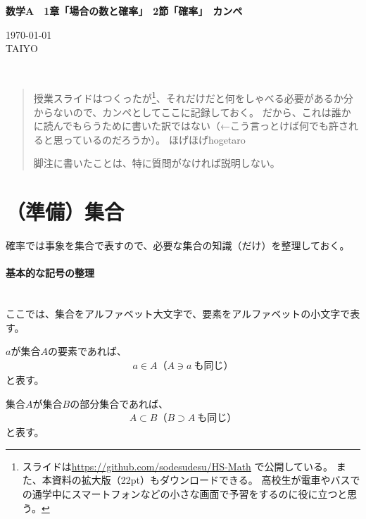 \documentclass[luatexja,fontsize=12pt]{jlreq}\usepackage{ifthen}\newcounter{enlarge}\setcounter{enlarge}{1}
\newcommand{\LS}[2]{\ifthenelse{\value{enlarge}=2 \OR \value{enlarge}=3}{#1}{#2}}
\newcommand{\LO}[1]{\LS{#1}{\relax}}
\begin{document}
{\Large%
\noindent
\textbf{%
数学A　1章「場合の数と確率」　2節「確率」　カンペ
\LO{\\ \color{teal} 〈拡大版〉}}
}

\begin{flushleft}
\today \\
TAIYO
\end{flushleft}

{\footnotesize%
\mbox{}\\

}
\begin{quotation}
授業スライドはつくったが\footnote{%
スライドは\url{https://github.com/sodesudesu/HS-Math}
で公開している。
また、本資料の拡大版（22pt）もダウンロードできる。
高校生が電車やバスでの通学中にスマートフォンなどの小さな画面で予習をするのに役に立つと思う。}、それだけだと何をしゃべる必要があるか分からないので、カンペとしてここに記録しておく。
だから、これは誰かに読んでもらうために書いた訳ではない（←こう言っとけば何でも許されると思っているのだろうか）。
ほげほげhogetaro

脚注に書いたことは、特に質問がなければ説明しない。
\end{quotation}

\section{（準備）集合}

確率では事象を集合で表すので、必要な集合の知識（だけ）を整理しておく。
\mbox{}\\

\paragraph{基本的な記号の整理}\mbox{}\\
\indent
ここでは、集合をアルファベット大文字で、要素をアルファベットの小文字で表す。

$a$が集合$A$の要素であれば、
\begin{align} \label{eq:0_1}
a \in A　（A \ni a~も同じ）
\end{align}
と表す。

集合$A$が集合$B$の部分集合であれば、
\begin{align} \label{eq:0_2}
A \subset B　（B \supset A~も同じ）
\end{align}
と表す。
\end{document}
